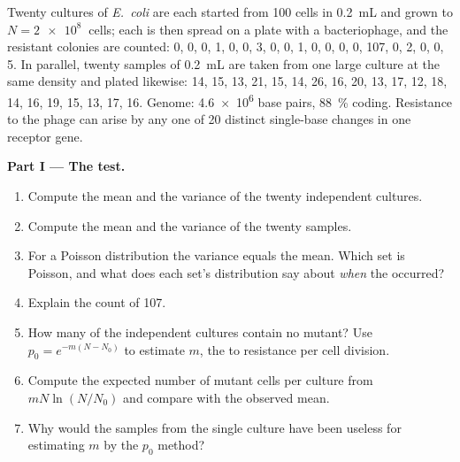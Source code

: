 \begin{problem}
\label{pb:b2:genome-diversification:1}
Twenty cultures of \emph{E.~coli} are each started from \num{100}
cells in \qty{0.2}{mL} and grown to $N = \qty{2e8}{}$ cells; each is
then spread on a plate with a bacteriophage, and the resistant
colonies are counted: 0, 0, 0, 1, 0, 0, 3, 0, 0, 1, 0, 0, 0, 0, 107,
0, 2, 0, 0, 5. In parallel, twenty samples of \qty{0.2}{mL} are taken
from one large culture at the same density and plated likewise:
14, 15, 13, 21, 15, 14, 26, 16, 20, 13, 17, 12, 18, 14, 16, 19, 15,
13, 17, 16. Genome: \qty{4.6e6}{} base pairs, \qty{88}{\%} coding.
Resistance to the phage can arise by any one of \num{20} distinct
single-base changes in one receptor gene.

\medskip
\noindent\textbf{Part I --- The test.}
\begin{enumerate}
  \item Compute the mean and the variance of the twenty independent
        cultures.
  \item Compute the mean and the variance of the twenty samples.
  \item For a Poisson distribution the variance equals the mean.
        Which set is Poisson, and what does each set's distribution
        say about \emph{when} the  occurred?
  \item Explain the count of 107.
  \item How many of the independent cultures contain no mutant? Use
        $p_0 = e^{-m(N - N_0)}$ to estimate $m$, the  to
        resistance per cell division.
  \item Compute the expected number of mutant cells per culture from
        $mN\ln(N/N_0)$ and compare with the observed mean.
  \item Why would the samples from the single culture have been
        useless for estimating $m$ by the $p_0$ method?
\end{enumerate}


\end{problem}
